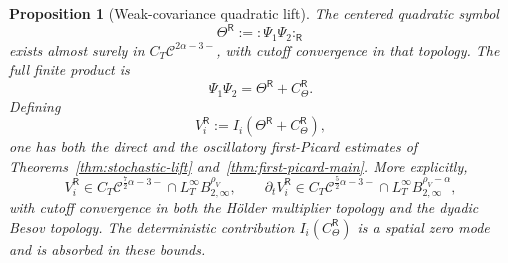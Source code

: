 \documentclass[10pt]{amsart}
\numberwithin{equation}{section}
\theoremstyle{plain}
\newtheorem{proposition}[theorem]{Proposition}
\theoremstyle{definition}
\theoremstyle{remark}
\begin{document}
\begin{proposition}[Weak-covariance quadratic lift]\label{prop:wc-quadratic-lift}
The centered quadratic symbol
\[
        \Theta^{\mathsf R}:=:\Psi_1\Psi_2:_{\mathsf R}
\]
exists almost surely in \(C_T\mathcal C^{2\alpha-3-}\), with cutoff convergence in that topology.  The full finite product is
\[
        \Psi_1\Psi_2=\Theta^{\mathsf R}+C_\Theta^{\mathsf R}.
\]
Defining
\begin{equation}\label{eq:wc-first-picard-def}
        V_i^{\mathsf R}:=I_i(\Theta^{\mathsf R}+C_\Theta^{\mathsf R}),
\end{equation}
one has both the direct and the oscillatory first-Picard estimates of Theorems~\ref{thm:stochastic-lift} and~\ref{thm:first-picard-main}.  More explicitly,
\[
        V_i^{\mathsf R}\in C_T\mathcal C^{\frac72\alpha-3-}
        \cap L_T^\infty B_{2,\infty}^{\rho_V},
        \qquad
        \partial_tV_i^{\mathsf R}\in C_T\mathcal C^{\frac52\alpha-3-}
        \cap L_T^\infty B_{2,\infty}^{\rho_V-\alpha},
\]
with cutoff convergence in both the H\"older multiplier topology and the dyadic Besov topology.  The deterministic contribution \(I_i(C_\Theta^{\mathsf R})\) is a spatial zero mode and is absorbed in these bounds.
\end{proposition}
\end{document}
